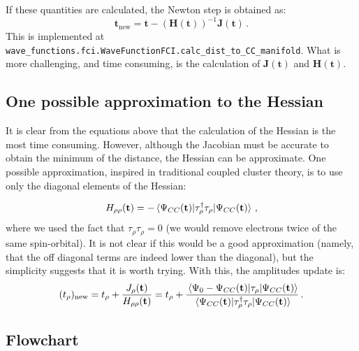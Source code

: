 If these quantities are calculated, the Newton step is obtained as:
\begin{equation}\label{eq:cc_minD_update}
  \mathbf{t}_\text{new} =
  \mathbf{t} - \left(\mathbf{H}(\mathbf{t})\right)^{-1}\mathbf{J}(\mathbf{t})\,.
\end{equation}
This is implemented at \texttt{wave\_functions.fci.WaveFunctionFCI.calc\_dist\_to\_CC\_manifold}.
What is more challenging, and time consuming, is the calculation of $\mathbf{J}(\mathbf{t})$ and
$\mathbf{H}(\mathbf{t})$.

\subsection{One possible approximation to the Hessian}
\label{sec:cc_man_appr_hess}

It is clear from the equations above that the calculation of the Hessian is the most time consuming.
However, although the Jacobian must be accurate to obtain the minimum of the distance,
the Hessian can be approximate.
One possible approximation, inspired in traditional coupled cluster theory,
is to use only the diagonal elements of the Hessian:

\begin{equation}\label{eq:cc_minD_hess_diag}
  \begin{split}
    H_{\rho\rho}(\mathbf{t}) =
    - \mel{\Psi_{CC}(\mathbf{t})}{\tau_\rho^\dagger\tau_\rho}{\Psi_{CC}(\mathbf{t})}\,,
  \end{split}
\end{equation}
where we used the fact that $\tau_\rho\tau_\rho = 0$
(we would remove electrons twice of the same spin-orbital).
It is not clear if this would be a good approximation
(namely, that the off diagonal terms are indeed lower than the diagonal),
but the simplicity suggests that it is worth trying.
With this, the amplitudes update is:
\begin{equation}\label{eq:cc_minD_update}
  (t_\rho)_\text{new}
  = t_\rho + \frac{J_\rho(\mathbf{t})}{H_{\rho\rho}(\mathbf{t})}
  = t_\rho
  + \frac{\mel{\Psi_0 - \Psi_{CC}(\mathbf{t})}{\tau_\rho}{\Psi_{CC}(\mathbf{t})}}
  {\mel{\Psi_{CC}(\mathbf{t})}{\tau_\rho^\dagger\tau_\rho}{\Psi_{CC}(\mathbf{t})}}\,.
\end{equation}



\newpage
\subsection{Flowchart}



